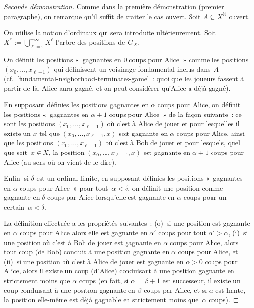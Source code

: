 \documentclass[12pt,a4paper]{article}
\theoremstyle{definition}
\begin{document}
\begin{proof}[Seconde démonstration]
Comme dans la première démonstration (premier paragraphe), on remarque
qu'il suffit de traiter le cas ouvert.  Soit $A \subseteq
X^{\mathbb{N}}$ ouvert.

On utilise la notion d'ordinaux qui sera introduite ultérieurement.
Soit $X^* := \bigcup_{\ell=0}^{+\infty} X^\ell$ l'arbre des positions
de $G_X$.

On définit les positions « gagnantes en $0$ coups pour Alice » comme
les positions $(x_0,\ldots,x_{\ell-1})$ qui définissent un voisinage
fondamental inclus dans $A$
(cf. \ref{fundamental-neighorhood-terminates-game} : quoi que les
joueurs fassent à partir de là, Alice aura gagné, et on peut
considérer qu'Alice a déjà gagné).

En supposant définies les positions gagnantes en $\alpha$ coups pour
Alice, on définit les positions « gagnantes en $\alpha+1$ coups pour
  Alice » de la façon suivante : ce sont les positions
$(x_0,\ldots,x_{\ell-1})$ où c'est à Alice de jouer et pour lesquelles
il existe un $x$ tel que $(x_0,\ldots,x_{\ell-1},x)$ soit gagnante en
$\alpha$ coups pour Alice, ainsi que les positions
$(x_0,\ldots,x_{\ell-1})$ où c'est à Bob de jouer et pour lesquels,
quel que soit $x\in X$, la position $(x_0,\ldots,x_{\ell-1},x)$ est
gagnante en $\alpha+1$ coups pour Alice (au sens où on vient de le
dire).

Enfin, si $\delta$ est un ordinal limite, en supposant définies les
positions « gagnantes en $\alpha$ coups pour Alice » pour tout $\alpha
< \delta$, on définit une position comme gagnante en $\delta$ coups
par Alice lorsqu'elle est gagnante en $\alpha$ coups pour un
certain $\alpha < \delta$.

La définition effectuée a les propriétés suivantes : (o) si une
position est gagnante en $\alpha$ coups pour Alice alors elle est
gagnante en $\alpha'$ coups pour tout $\alpha'>\alpha$, (i) si une
position où c'est à Bob de jouer est gagnante en $\alpha$ coups pour
Alice, alors tout coup (de Bob) conduit à une position gagnante en
$\alpha$ coups pour Alice, et (ii) si une position où c'est à Alice de
jouer est gagnante en $\alpha > 0$ coups pour Alice, alors il existe
un coup (d'Alice) conduisant à une position gagnante en strictement
moins que $\alpha$ coups (en fait, si $\alpha = \beta+1$ est
successeur, il existe un coup conduisant à une position gagnante en
$\beta$ coups par Alice, et si $\alpha$ est limite, la position
elle-même est déjà gagnable en strictement moins que $\alpha$ coups).


\end{proof}
\end{document}
